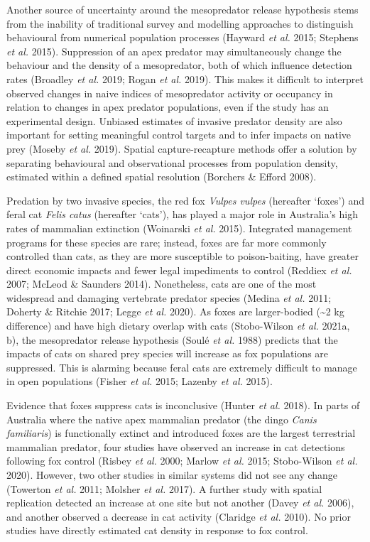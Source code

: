 \documentclass[]{elsarticle} %
\begin{document}
Another source of uncertainty around the mesopredator release hypothesis stems from the inability of traditional survey and modelling approaches to distinguish behavioural from numerical population processes (Hayward \emph{et al.} 2015; Stephens \emph{et al.} 2015). Suppression of an apex predator may simultaneously change the behaviour and the density of a mesopredator, both of which influence detection rates (Broadley \emph{et al.} 2019; Rogan \emph{et al.} 2019). This makes it difficult to interpret observed changes in naive indices of mesopredator activity or occupancy in relation to changes in apex predator populations, even if the study has an experimental design. Unbiased estimates of invasive predator density are also important for setting meaningful control targets and to infer impacts on native prey (Moseby \emph{et al.} 2019). Spatial capture-recapture methods offer a solution by separating behavioural and observational processes from population density, estimated within a defined spatial resolution (Borchers \& Efford 2008).

Predation by two invasive species, the red fox \emph{Vulpes vulpes} (hereafter `foxes') and feral cat \emph{Felis catus} (hereafter `cats'), has played a major role in Australia's high rates of mammalian extinction (Woinarski \emph{et al.} 2015). Integrated management programs for these species are rare; instead, foxes are far more commonly controlled than cats, as they are more susceptible to poison-baiting, have greater direct economic impacts and fewer legal impediments to control (Reddiex \emph{et al.} 2007; McLeod \& Saunders 2014). Nonetheless, cats are one of the most widespread and damaging vertebrate predator species (Medina \emph{et al.} 2011; Doherty \& Ritchie 2017; Legge \emph{et al.} 2020). As foxes are larger-bodied (\textasciitilde2 kg difference) and have high dietary overlap with cats (Stobo-Wilson \emph{et al.} 2021a, b), the mesopredator release hypothesis (Soulé \emph{et al.} 1988) predicts that the impacts of cats on shared prey species will increase as fox populations are suppressed. This is alarming because feral cats are extremely difficult to manage in open populations (Fisher \emph{et al.} 2015; Lazenby \emph{et al.} 2015).

Evidence that foxes suppress cats is inconclusive (Hunter \emph{et al.} 2018). In parts of Australia where the native apex mammalian predator (the dingo \emph{Canis familiaris}) is functionally extinct and introduced foxes are the largest terrestrial mammalian predator, four studies have observed an increase in cat detections following fox control (Risbey \emph{et al.} 2000; Marlow \emph{et al.} 2015; Stobo-Wilson \emph{et al.} 2020). However, two other studies in similar systems did not see any change (Towerton \emph{et al.} 2011; Molsher \emph{et al.} 2017). A further study with spatial replication detected an increase at one site but not another (Davey \emph{et al.} 2006), and another observed a decrease in cat activity (Claridge \emph{et al.} 2010). No prior studies have directly estimated cat density in response to fox control.
\end{document}
